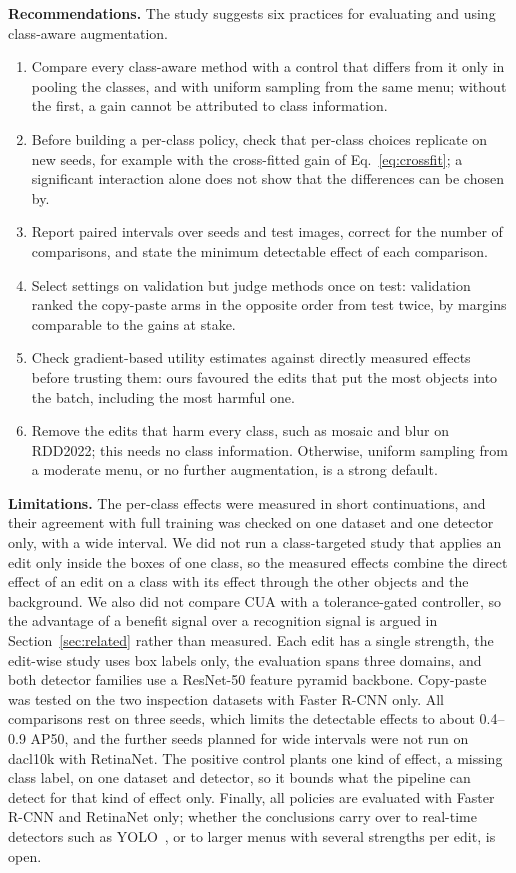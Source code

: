 \documentclass[conference]{IEEEtran}
\begin{document}
\noindent\textbf{Recommendations.} The study suggests six practices for evaluating and using class-aware augmentation.
\begin{enumerate}
    \item Compare every class-aware method with a control that differs from it only in pooling the classes, and with uniform sampling from the same menu; without the first, a gain cannot be attributed to class information.
    \item Before building a per-class policy, check that per-class choices replicate on new seeds, for example with the cross-fitted gain of Eq.~\eqref{eq:crossfit}; a significant interaction alone does not show that the differences can be chosen by.
    \item Report paired intervals over seeds and test images, correct for the number of comparisons, and state the minimum detectable effect of each comparison.
    \item Select settings on validation but judge methods once on test: validation ranked the copy-paste arms in the opposite order from test twice, by margins comparable to the gains at stake.
    \item Check gradient-based utility estimates against directly measured effects before trusting them: ours favoured the edits that put the most objects into the batch, including the most harmful one.
    \item Remove the edits that harm every class, such as mosaic and blur on RDD2022; this needs no class information. Otherwise, uniform sampling from a moderate menu, or no further augmentation, is a strong default.
\end{enumerate}

\noindent\textbf{Limitations.} The per-class effects were measured in short continuations, and their agreement with full training was checked on one dataset and one detector only, with a wide interval. We did not run a class-targeted study that applies an edit only inside the boxes of one class, so the measured effects combine the direct effect of an edit on a class with its effect through the other objects and the background. We also did not compare CUA with a tolerance-gated controller, so the advantage of a benefit signal over a recognition signal is argued in Section~\ref{sec:related} rather than measured. Each edit has a single strength, the edit-wise study uses box labels only, the evaluation spans three domains, and both detector families use a ResNet-50 feature pyramid backbone. Copy-paste was tested on the two inspection datasets with Faster R-CNN only. All comparisons rest on three seeds, which limits the detectable effects to about 0.4--0.9 AP50, and the further seeds planned for wide intervals were not run on dacl10k with RetinaNet. The positive control plants one kind of effect, a missing class label, on one dataset and detector, so it bounds what the pipeline can detect for that kind of effect only. Finally, all policies are evaluated with Faster R-CNN and RetinaNet only; whether the conclusions carry over to real-time detectors such as YOLO~\cite{bochkovskiy2020yolov4}, or to larger menus with several strengths per edit, is open.
\end{document}
